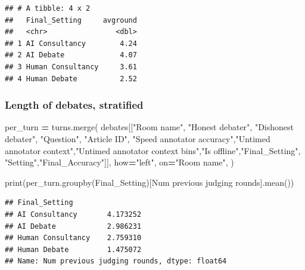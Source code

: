 \documentclass[
]{article}
\newenvironment{Shaded}{\begin{snugshade}}{\end{snugshade}}
\newcommand{\BuiltInTok}[1]{#1}
\newcommand{\NormalTok}[1]{#1}
\newcommand{\OperatorTok}[1]{\textcolor[rgb]{0.81,0.36,0.00}{\textbf{#1}}}
\newcommand{\StringTok}[1]{\textcolor[rgb]{0.31,0.60,0.02}{#1}}
\begin{document}
\begin{verbatim}
## # A tibble: 4 x 2
##   Final_Setting     avground
##   <chr>                <dbl>
## 1 AI Consultancy        4.24
## 2 AI Debate             4.07
## 3 Human Consultancy     3.61
## 4 Human Debate          2.52
\end{verbatim}

\hypertarget{length-of-debates-stratified}{%
\subsubsection{Length of debates,
stratified}\label{length-of-debates-stratified}}

\begin{Shaded}
\begin{Highlighting}[]
\NormalTok{per\_turn }\OperatorTok{=}\NormalTok{ turns.merge(}
\NormalTok{        debates[[}\StringTok{"Room name"}\NormalTok{, }\StringTok{"Honest debater"}\NormalTok{, }\StringTok{"Dishonest debater"}\NormalTok{, }\StringTok{"Question"}\NormalTok{, }\StringTok{"Article ID"}\NormalTok{,}
                 \StringTok{"Speed annotator accuracy"}\NormalTok{,}\StringTok{"Untimed annotator context"}\NormalTok{,}\StringTok{"Untimed annotator context bins"}\NormalTok{,}\StringTok{"Is offline"}\NormalTok{,}\StringTok{"Final\_Setting"}\NormalTok{, }\StringTok{"Setting"}\NormalTok{,}\StringTok{"Final\_Accuracy"}\NormalTok{]],}
\NormalTok{        how}\OperatorTok{=}\StringTok{"left"}\NormalTok{,}
\NormalTok{        on}\OperatorTok{=}\StringTok{"Room name"}\NormalTok{,}
\NormalTok{    )}

\BuiltInTok{print}\NormalTok{(per\_turn.groupby(}\StringTok{\textquotesingle{}Final\_Setting\textquotesingle{}}\NormalTok{)[}\StringTok{\textquotesingle{}Num previous judging rounds\textquotesingle{}}\NormalTok{].mean())}
\end{Highlighting}
\end{Shaded}

\begin{verbatim}
## Final_Setting
## AI Consultancy       4.173252
## AI Debate            2.986231
## Human Consultancy    2.759310
## Human Debate         1.475072
## Name: Num previous judging rounds, dtype: float64
\end{verbatim}
\end{document}
